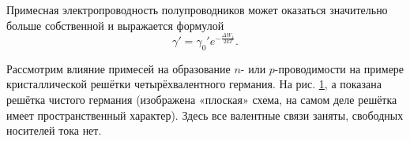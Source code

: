 \documentclass[a4paper,10pt]{book}
\begin{document}
Примесная электропроводность полупроводников может оказаться значительно больше собственной и выражается формулой\begin{equation}\label{26.4}
\gamma' = \gamma_0' e^{-\frac{\Delta W_1}{2kT}}.
\end{equation}

Рассмотрим влияние примесей на образование $n$- или $p$-проводимости на примере кристаллической решётки четырёхвалентного германия. На рис. \ref{pic58a}, $\textit{а}$ показана решётка чистого германия (изображена «плоская» схема, на самом деле решётка имеет пространственный характер). Здесь все валентные связи заняты, свободных носителей тока нет.

\begin{figure}[h]
	\caption{}
	\label{pic58a}
\end{figure}
\begin{figure}[h]
	\caption{}
	\label{pic58bc}
\end{figure}
\end{document}
